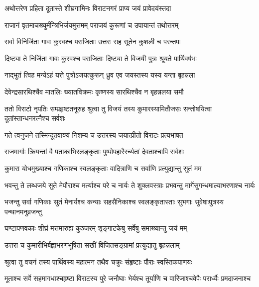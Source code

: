 
\twolineshloka
{अथोत्तरेण प्रहिता दूतास्ते शीघ्रगामिनः}
{विराटनगरं प्राप्य जयं प्रावेदयंस्तदा}


\twolineshloka
{राजानं वृतमाचख्युर्मन्त्रिभिर्जयमुत्तमम्}
{पराजयं कुरूणां च उपायान्तं तथोत्तरम्}


\twolineshloka
{सर्वा विनिर्जिता गावः कुरवश्च पराजिताः}
{उत्तरः सह सूतेन कुशली च परन्तपः}




\twolineshloka
{दिष्ट्या ते निर्जिता गावः कुरवश्च पराजिताः}
{दिष्ट्या ते विजयी पुत्रः श्रूयते पार्थिवर्षभः}


\twolineshloka
{नाद्भुतं त्विह मन्येऽहं यत्ते पुत्रोऽजयत्कुरून्}
{ध्रुव एव जयस्तस्य यस्य यन्ता बृहन्नला}


\twolineshloka
{देवेन्द्रसारथिश्चैव मातलिः ख्यातविक्रमः}
{कृष्णस्य सारथिश्चैव न बृहन्नलया समौ}



\threelineshloka
{ततो विराटो नृपतिः सम्प्रहृष्टतनूरुह}
{श्रुत्वा तु विजयं तस्य कुमारस्यामितौजसः}
{सन्तोषयित्वा दूतांस्तान्धनरत्नैश्च सर्वशः}


\twolineshloka
{गते त्वनुजने तस्मिन्दूतवाक्यं निशम्य च}
{उत्तरस्य जयात्प्रीतो विराटः प्रत्यभाषत}


\twolineshloka
{राजमार्गाः क्रियन्तां वै पताकाभिरलङ्कृताः}
{पुष्पोपहारैरर्च्यतां देवताश्चापि सर्वशः}


\twolineshloka
{कुमारा योधमुख्याश्च गणिकाश्च स्वलङ्कृताः}
{वादित्राणि च सर्वाणि प्रत्युद्यान्तु सुतं मम}


\twolineshloka
{भवन्तु ते लब्धजये सुते मेपौराश्च मर्त्याश्च परे च नार्यः}
{ते शुक्लवस्त्राः प्रभवन्तु मार्गेसुगन्धमाल्याभरणाश्च नार्यः}


\twolineshloka
{भजन्तु सर्वा गणिकाः सुतं मेनार्यश्च कन्याः सहसैनिकाश्च}
{स्वलङ्कृतास्ताः सुभगाः सुवेषाःपुत्रस्य पन्थानमनुव्रजन्तु}


\twolineshloka
{घण्टापणवकाः शीघ्रं मत्तमारुह्य कुञ्जरम्}
{शृङ्गाटकेषु सर्वेषु समाख्यान्तु जयं मम्}


\twolineshloka
{उत्तरा च कुमारीभिर्बह्वाभरणभूषिता}
{सखीं विजितसङ्ग्रामां प्रत्युद्यातु बृहन्नलाम्}


\twolineshloka
{श्रुत्वा तु वचनं तस्य पार्थिवस्य महात्मन}
{तथैव चक्रुः संहृष्टाः पौराः स्वस्तिकपाणयः}


\twolineshloka
{मूताश्च सर्वे सहमागधाश्चहृष्टा विराटस्य पुरे जनौघाः}
{भेर्यश्च तूर्याणि च वारिजाश्चवेपैः परार्ध्यैः प्रमदाजनाश्च}


